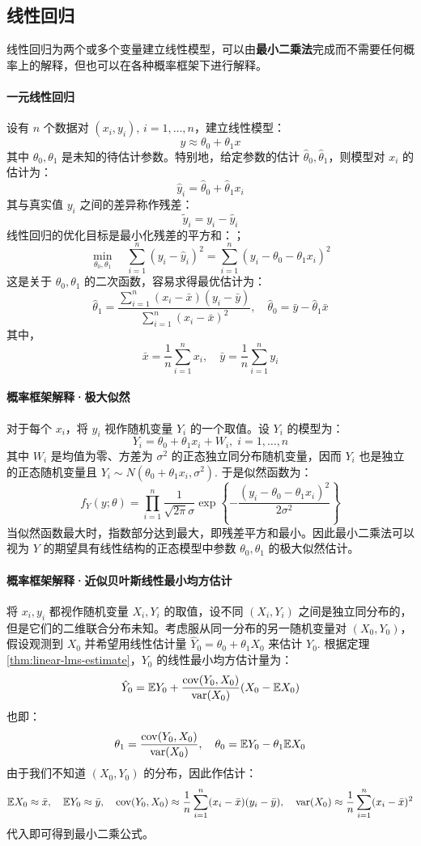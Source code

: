 \subsection{线性回归}

线性回归为两个或多个变量建立线性模型，可以由\textbf{最小二乘法}完成而不需要任何概率上的解释，但也可以在各种概率框架下进行解释。

\paragraph{一元线性回归}
设有 $n$ 个数据对 $(x_i,y_i),\,i=1,\ldots,n$，建立线性模型：
\[
y\approx\theta_0+\theta_1 x
\]
其中 $\theta_0,\theta_1$ 是未知的待估计参数。特别地，给定参数的估计 $\hat\theta_0,\hat\theta_1$，则模型对 $x_i$ 的估计为：
\[
\hat y_i=\hat\theta_0+\hat\theta_1 x_i
\]
其与真实值 $y_i$ 之间的差异称作残差：
\[
\tilde y_i=y_i-\hat y_i
\]
线性回归的优化目标是最小化残差的平方和：；
\[
\min_{\theta_0,\theta_1}\quad \sum_{i=1}^n(y_i-\hat y_i)^2=\sum_{i=1}^n(y_i-\theta_0-\theta_1 x_i)^2
\]
这是关于 $\theta_0,\theta_1$ 的二次函数，容易求得最优估计为：
\[
\hat\theta_1=\frac{\sum\limits_{i=1}^n(x_i-\bar x)(y_i-\bar y)}{\sum\limits_{i=1}^n(x_i-\bar x)^2},\quad\hat\theta_0=\bar y-\hat\theta_1\bar x
\]
其中，
\[
\bar x=\frac{1}{n}\sum_{i=1}^n x_i,\quad \bar y=\frac{1}{n}\sum_{i=1}^ny_i
\]

\paragraph{概率框架解释·极大似然}
对于每个 $x_i$，将 $y_i$ 视作随机变量 $Y_i$ 的一个取值。设 $Y_i$ 的模型为：
\[
Y_i=\theta_0+\theta_1 x_i+W_i,\;i=1,\ldots,n
\]
其中 $W_i$ 是均值为零、方差为 $\sigma^2$ 的正态独立同分布随机变量，因而 $Y_i$ 也是独立的正态随机变量且 $Y_i\sim N(\theta_0+\theta_1 x_i,\sigma^2)$. 于是似然函数为：
\[
f_Y(y;\theta)=\prod_{i=1}^n\frac{1}{\sqrt{2\pi}\sigma}\exp\left\{-\frac{(y_i-\theta_0-\theta_1 x_i)^2}{2\sigma^2}\right\}
\]
当似然函数最大时，指数部分达到最大，即残差平方和最小。因此最小二乘法可以视为 $Y$ 的期望具有线性结构的正态模型中参数 $\theta_0,\theta_1$ 的极大似然估计。

\paragraph{概率框架解释·近似贝叶斯线性最小均方估计}
将 $x_i,y_i$ 都视作随机变量 $X_i,Y_i$ 的取值，设不同 $(X_i,Y_i)$ 之间是独立同分布的，但是它们的二维联合分布未知。考虑服从同一分布的另一随机变量对 $(X_0,Y_0)$，假设观测到 $X_0$ 并希望用线性估计量 $\hat Y_0=\theta_0+\theta_1 X_0$ 来估计 $Y_0$. 根据定理 \ref{thm:linear-lms-estimate}，$Y_0$ 的线性最小均方估计量为：
\[
\hat Y_0=\mathbb{E} Y_0+\frac{\mathrm{cov}(Y_0,X_0)}{\mathrm{var}(X_0)}(X_0-\mathbb{E} X_0)
\]
也即：
\[
\theta_1=\frac{\mathrm{cov}(Y_0,X_0)}{\mathrm{var}(X_0)},\quad\theta_0=\mathbb{E} Y_0-\theta_1\mathbb{E} X_0
\]
由于我们不知道 $(X_0,Y_0)$ 的分布，因此作估计：
\[
    \mathbb{E} X_0\approx\bar x,\quad
    \mathbb{E} Y_0\approx\bar y,\quad
    \mathrm{cov}(Y_0,X_0)\approx\frac{1}{n}\sum_{i=1}^n(x_i-\bar x)(y_i-\bar y),\quad
    \mathrm{var}(X_0)\approx\frac{1}{n}\sum_{i=1}^n(x_i-\bar x)^2
\]
代入即可得到最小二乘公式。

